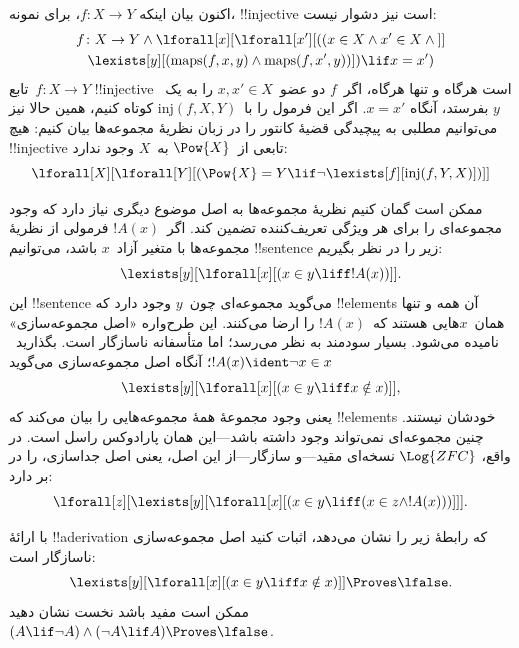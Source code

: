 \documentclass[../../../include/open-logic-section]{subfiles}
\begin{document}
اکنون بیان اینکه $f\colon X \to Y$، برای نمونه، !!{injective} است نیز
دشوار نیست:
\begin{multline*}
 f \colon X \to Y \land \lforall[x][\lforall[x'][((x \in X \land x' \in
     X \land {}]] \\
 \lexists[y][(\mathrm{maps}(f, x, y) \land \mathrm{maps}(f,
        x', y))]) \lif x = x')
\end{multline*}
تابع~$f\colon X \to Y$ !!{injective} است هرگاه و تنها هرگاه، اگر~$f$ دو
عضو~$x, x' \in X$ را به یک~$y$ بفرستد، آنگاه $x = x'$. اگر این فرمول را
با~$\mathrm{inj}(f, X, Y)$ کوتاه کنیم، همین حالا نیز می‌توانیم مطلبی
به پیچیدگی قضیهٔ کانتور را در زبان نظریهٔ مجموعه‌ها بیان کنیم: هیچ
!!{injective} تابعی از~$\Pow{X}$ به~$X$ وجود ندارد:
\[
\lforall[X][\lforall[Y][(\Pow{X} = Y \lif
    \lnot\lexists[f][\mathrm{inj}(f, Y, X)])]]
\]

ممکن است گمان کنیم نظریهٔ مجموعه‌ها به اصل موضوع دیگری نیاز دارد که
وجود مجموعه‌ای را برای هر ویژگی تعریف‌کننده تضمین کند. اگر~$!A(x)$
فرمولی از نظریهٔ مجموعه‌ها با متغیر آزاد~$x$ باشد، می‌توانیم
!!{sentence} زیر را در نظر بگیریم:
\[
\lexists[y][\lforall[x][(x \in y \liff !A(x))]].
\]
این !!{sentence} می‌گوید مجموعه‌ای چون~$y$ وجود دارد که !!{element}s آن
همه و تنها همان~$x$هایی هستند که~$!A(x)$ را ارضا می‌کنند. این طرح‌واره
«اصل مجموعه‌سازی» نامیده می‌شود. بسیار سودمند به نظر می‌رسد؛ اما
متأسفانه ناسازگار است. بگذارید~$!A(x) \ident \lnot x \in x$؛ آنگاه اصل
مجموعه‌سازی می‌گوید
\[
\lexists[y][\lforall[x][(x \in y \liff x \notin x)]],
\]
یعنی وجود مجموعهٔ همهٔ مجموعه‌هایی را بیان می‌کند که !!{element}s
خودشان نیستند. چنین مجموعه‌ای نمی‌تواند وجود داشته باشد---این همان
پارادوکس راسل است. در واقع، $\Log{ZFC}$ نسخه‌ای مقید---و سازگار---از
این اصل، یعنی اصل جداسازی، را در بر دارد:
\[
\lforall[z][\lexists[y][\lforall[x][(x \in y \liff (x \in z \land
      !A(x)))]]].
\]

\begin{prob}
با ارائهٔ !!a{derivation} که رابطهٔ زیر را نشان می‌دهد، اثبات کنید اصل
مجموعه‌سازی ناسازگار است:
\[
\lexists[y][\lforall[x][(x \in y \liff x \notin x)]] \Proves \lfalse.
\]
ممکن است مفید باشد نخست نشان دهید
$(A \lif \lnot A) \land (\lnot A \lif A) \Proves \lfalse$.
\end{prob}
\end{document}
